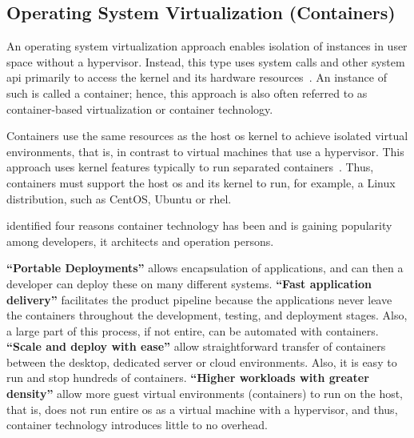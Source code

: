 

\subsection{Operating System Virtualization (Containers)}\label{background:osvirtual}

An operating system virtualization approach enables isolation of instances in user space without a hypervisor.
Instead, this type uses system calls and other system \gls{api} primarily to access the kernel and its hardware resources~\cite{bauer2012reliability}.
An instance of such is called a container; hence, this approach is also often referred to as container-based virtualization or container technology.

\newline
\null\newline
\null\newline
\null\newline
\null\newline
\skippara Containers use the same resources as the host \gls{os} kernel to achieve isolated virtual environments, that is, in contrast to virtual machines that use a hypervisor.
This approach uses kernel features typically to run separated containers~\cite{xavier2013performance, namespac0:online}.
Thus, containers must support the host \gls{os} and its kernel to run, for example, a Linux distribution, such as CentOS, Ubuntu or \gls{rhel}.

\skippara \citet*{joy2015performance} identified four reasons container technology has been and is gaining popularity among developers, \gls{it} architects and operation persons.

\skippara \textbf{``Portable Deployments''} allows encapsulation of applications, and can then a developer can deploy these on many different systems.
\skippara \textbf{``Fast application delivery''} facilitates the product pipeline because the applications never leave the containers throughout the development, testing, and deployment stages. Also, a large part of this process, if not entire, can be automated with containers.
\skippara \textbf{``Scale and deploy with ease''} allow straightforward transfer of containers between the desktop, dedicated server or cloud environments. Also, it is easy to run and stop hundreds of containers.
\skippara \textbf{``Higher workloads with greater density''} allow more guest virtual environments (containers) to run on the host, that is, does not run entire \gls{os} as a virtual machine with a hypervisor, and thus, container technology introduces little to no overhead.

